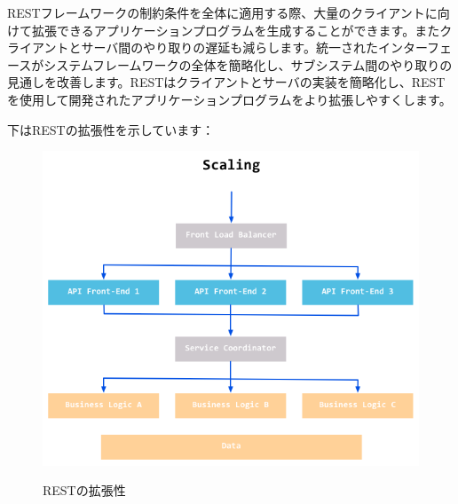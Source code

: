 RESTフレームワークの制約条件を全体に適用する際、大量のクライアントに向けて拡張できるアプリケーションプログラムを生成することができます。またクライアントとサーバ間のやり取りの遅延も減らします。統一されたインターフェースがシステムフレームワークの全体を簡略化し、サブシステム間のやり取りの見通しを改善します。RESTはクライアントとサーバの実装を簡略化し、RESTを使用して開発されたアプリケーションプログラムをより拡張しやすくします。

下はRESTの拡張性を示しています：


\begin{figure}[H]
   \includegraphics[width=14cm]{8.3.rest.png}
   \label{図8.6}
   \caption{RESTの拡張性}
\end{figure}






